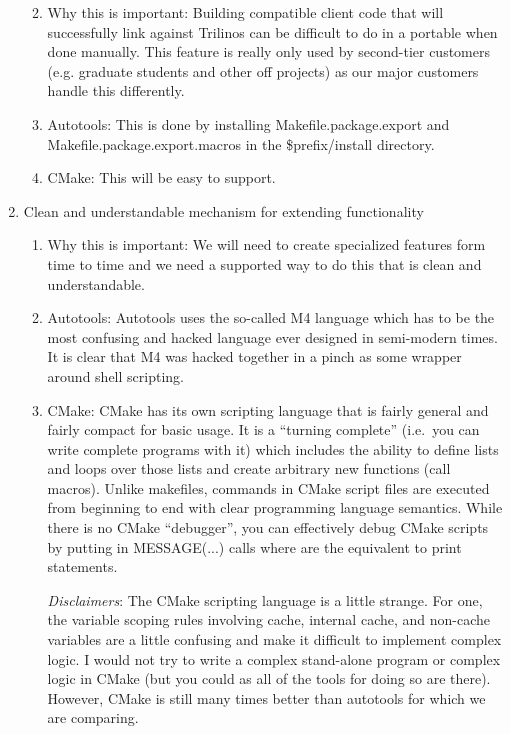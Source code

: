 \documentclass[pdf,ps2pdf,11pt]{SANDreport}
\begin{document}
\begin{enumerate}
  \begin{enumerate}

  {}\item Why this is important: Building compatible client code
  that will successfully link against Trilinos can be difficult to
  do in a portable when done manually.  This feature is really only used
  by second-tier customers (e.g. graduate students and other off
  projects) as our major customers handle this differently.

  {}\item Autotools: This is done by installing
  Makefile.package.export and Makefile.package.export.macros in the
  \$prefix/install directory.

  {}\item CMake: This will be easy to support.

  \end{enumerate}

{}\item Clean and understandable mechanism for extending
functionality

  \begin{enumerate}

  {}\item Why this is important: We will need to create specialized
  features form time to time and we need a supported way to do this
  that is clean and understandable.

  {}\item Autotools: Autotools uses the so-called M4 language which
  has to be the most confusing and hacked language ever designed in
  semi-modern times.  It is clear that M4 was hacked together in a
  pinch as some wrapper around shell scripting.

  {}\item CMake: CMake has its own scripting language that is fairly
  general and fairly compact for basic usage.  It is a ``turning
  complete'' (i.e.\ you can write complete programs with it) which
  includes the ability to define lists and loops over those lists and
  create arbitrary new functions (call macros).  Unlike makefiles,
  commands in CMake script files are executed from beginning to end
  with clear programming language semantics.  While there is no CMake
  ``debugger'', you can effectively debug CMake scripts by putting in
  MESSAGE(...) calls where are the equivalent to print statements.

  {}\textit{Disclaimers}: The CMake scripting language is a little
  strange.  For one, the variable scoping rules involving cache,
  internal cache, and non-cache variables are a little confusing and
  make it difficult to implement complex logic.  I would not try to
  write a complex stand-alone program or complex logic in CMake (but
  you could as all of the tools for doing so are there).  However,
  CMake is still many times better than autotools for which we are
  comparing.


\end{enumerate}
\end{enumerate}
\end{document}

